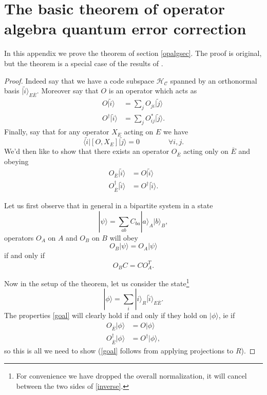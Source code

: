 \documentclass[12pt]{article}
\newcommand{\be}{\begin{equation}}
\newcommand{\ee}{\end{equation}}
\newcommand{\HC}{\mathcal{H}_{\mathcal{C}}}
\newcommand{\lan}{\langle}
\newcommand{\ran}{\rangle}
\newcommand{\wt}{\widetilde}
\newcommand{\ol}{\overline}
\begin{document}
\section{The basic theorem of operator algebra quantum error correction} \label{thmapp}
In this appendix we prove the theorem of section \ref{opalgsec}.  The proof is original, but the theorem is a special case of the results of \cite{beny2007generalization,beny2007quantum}.
\begin{proof}
Indeed say that we have a code subspace $\HC$ spanned by an orthonormal basis $|\wt{i}\ran_{E\ol{E}}$.  Moreover say that $O$ is an operator which acts as
\begin{align}\nonumber
O|\wt{i}\ran&=\sum_j O_{ji}|\wt{j}\ran\\
O^\dagger|\wt{i}\ran&=\sum_j O_{ij}^*|\wt{j}\ran.
\end{align}
Finally, say that for any operator $X_E$ acting on $E$ we have
\be\label{commcond}
\lan \wt{i}|[O,X_E]|\wt{j}\ran=0  \qquad \qquad \forall  i,j.
\ee
We'd then like to show that there exists an operator $O_{\ol{E}}$ acting only on $\ol{E}$ and obeying
\begin{align}\nonumber
O_{\ol{E}}|\wt{i}\ran&=O|\wt{i}\ran\\
O_{\ol{E}}^\dagger|\wt{i}\ran&=O^\dagger |\wt{i}\ran.\label{goal}
\end{align}

Let us first observe that in general in a bipartite system in a state
\be
|\psi\ran=\sum_{ab}C_{ba}|a\ran_A |b\ran_B,
\ee
operators $O_A$ on $A$ and $O_B$ on $B$ will obey 
\be
O_B|\psi\ran=O_A|\psi\ran
\ee
if and only if 
\be\label{inverse}
O_B C=C O_A^T.
\ee


Now in the setup of the theorem, let us consider the state\footnote{For convenience we have dropped the overall normalization, it will cancel between the two sides of \eqref{inverse}.}
\be\label{phidef}
|\phi\ran=\sum_i|i\ran_R |\wt{i}\ran_{E\ol{E}}.
\ee
The properties \eqref{goal} will clearly hold if and only if they hold on $|\phi\ran$, ie if
\begin{align}\nonumber
O_{\ol{E}}|\phi\ran&=O|\phi\ran\\
O_{\ol{E}}^\dagger|\phi\ran&=O^\dagger |\phi\ran,\label{goal2}
\end{align}
so this is all we need to show (\eqref{goal} follows from applying projections to $R$).  


\end{proof}
\end{document}
